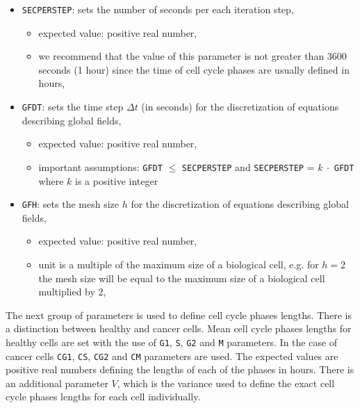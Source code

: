 \documentclass[10pt]{article}
\begin{document}
\begin{itemize}
\item {\tt SECPERSTEP}: sets the number of seconds per each iteration step,
\begin{itemize}
\item expected value: positive real number,
\item we recommend that the value of this parameter is not greater than 3600 seconds (1 hour) since the time of cell cycle phases are usually defined in hours,
\end{itemize}

\item {\tt GFDT}: sets the time step $\Delta t$ (in seconds) for the discretization of equations describing global fields,
\begin{itemize}
\item expected value: positive real number,
\item important assumptions: {\tt GFDT} $\le$ {\tt SECPERSTEP} and {\tt SECPERSTEP} = $k\ \cdot$ {\tt GFDT} where $k$ is a positive integer
\end{itemize}

\item {\tt GFH}: sets the mesh size $h$ for the discretization of equations describing global fields,
\begin{itemize}
\item expected value: positive real number,
\item unit is a multiple of the maximum size of a biological cell, e.g. for $h=2$ the mesh size will be equal to the maximum size of a biological cell multiplied by 2,
\end{itemize}

\end{itemize}

\indent The next group of parameters is used to define cell cycle phases lengths. There is a distinction between healthy and cancer cells. Mean cell cycle phases lengths for healthy cells are set with the use of {\tt G1}, {\tt S}, {\tt G2} and {\tt M} parameters. In the case of cancer cells {\tt CG1}, {\tt CS}, {\tt CG2} and {\tt CM} parameters are used. The expected values are positive real numbers defining the lengths of each of the phases in hours. There is an additional parameter $V$, which is the variance used to define the exact cell cycle phases lengths for each cell individually. 
\end{document}
